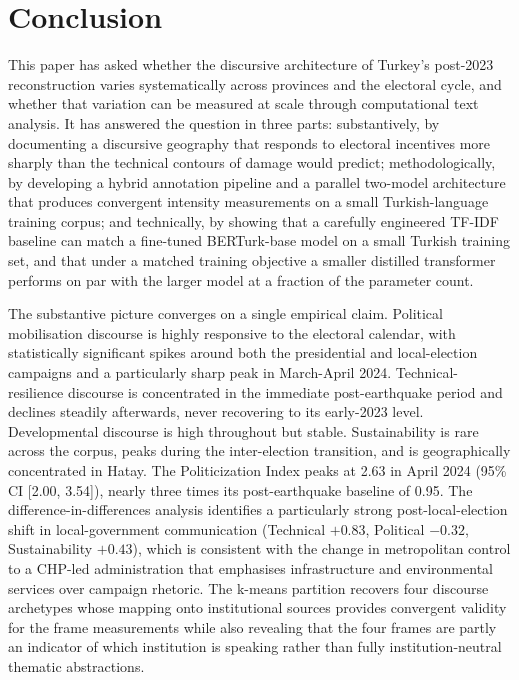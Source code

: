 \documentclass[12pt, journal]{IEEEtran}
\begin{document}
\section{Conclusion}
This paper has asked whether the discursive architecture of Turkey's post-2023 reconstruction varies systematically across provinces and the electoral cycle, and whether that variation can be measured at scale through computational text analysis. It has answered the question in three parts: substantively, by documenting a discursive geography that responds to electoral incentives more sharply than the technical contours of damage would predict; methodologically, by developing a hybrid annotation pipeline and a parallel two-model architecture that produces convergent intensity measurements on a small Turkish-language training corpus; and technically, by showing that a carefully engineered TF-IDF baseline can match a fine-tuned BERTurk-base model on a small Turkish training set, and that under a matched training objective a smaller distilled transformer performs on par with the larger model at a fraction of the parameter count.

The substantive picture converges on a single empirical claim. Political mobilisation discourse is highly responsive to the electoral calendar, with statistically significant spikes around both the presidential and local-election campaigns and a particularly sharp peak in March-April 2024. Technical-resilience discourse is concentrated in the immediate post-earthquake period and declines steadily afterwards, never recovering to its early-2023 level. Developmental discourse is high throughout but stable. Sustainability is rare across the corpus, peaks during the inter-election transition, and is geographically concentrated in Hatay. The Politicization Index peaks at 2.63 in April 2024 (95\% CI [2.00, 3.54]), nearly three times its post-earthquake baseline of 0.95. The difference-in-differences analysis identifies a particularly strong post-local-election shift in local-government communication (Technical $+0.83$, Political $-0.32$, Sustainability $+0.43$), which is consistent with the change in metropolitan control to a CHP-led administration that emphasises infrastructure and environmental services over campaign rhetoric. The k-means partition recovers four discourse archetypes whose mapping onto institutional sources provides convergent validity for the frame measurements while also revealing that the four frames are partly an indicator of which institution is speaking rather than fully institution-neutral thematic abstractions.
\end{document}
